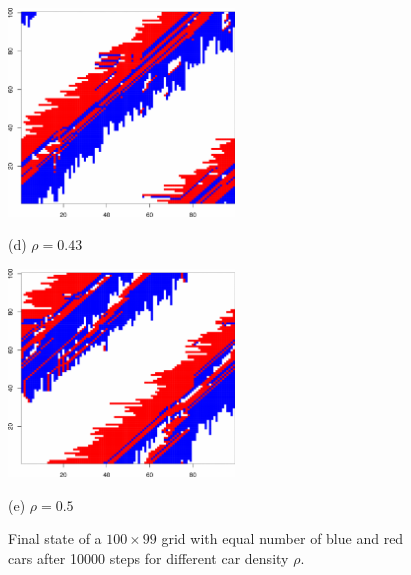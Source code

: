 \documentclass{article}
\begin{document}
\begin{figure}[!t]
    \hfill
    \begin{minipage}[b]{0.5\linewidth}
      \centering
      \centerline{\includegraphics[width=6.0cm]{./figs/TestBehavior_100_99_10000_043_end}}
      \centerline{(d) $\rho = 0.43$}\medskip
    \end{minipage}
    \hfill
    \begin{minipage}[b]{1\linewidth}
      \centering
      \centerline{\includegraphics[width=6.0cm]{./figs/TestBehavior_100_99_10000_05_end}}
      \centerline{(e) $\rho = 0.5$}\medskip
    \end{minipage}
    \caption{Final state of a $100\times99$ grid with equal number of blue and
    red cars after 10000 steps for different car density $\rho$.}
    \label{fig:final_state}
\end{figure}
\end{document}

